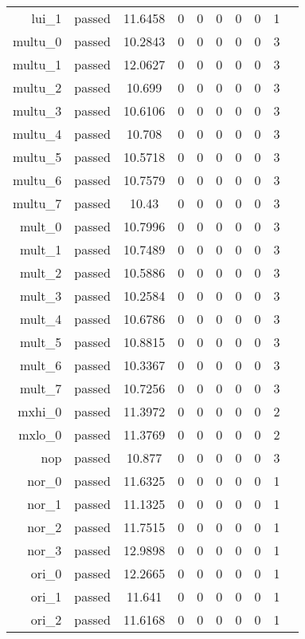 \begin{longtable}{r|ccccccccc}
    lui\_1 & passed & 11.6458 & 0 & 0 & 0 & 0 & 0 & 1 \\
    multu\_0 & passed & 10.2843 & 0 & 0 & 0 & 0 & 0 & 3 \\
    multu\_1 & passed & 12.0627 & 0 & 0 & 0 & 0 & 0 & 3 \\
    multu\_2 & passed & 10.699 & 0 & 0 & 0 & 0 & 0 & 3 \\
    multu\_3 & passed & 10.6106 & 0 & 0 & 0 & 0 & 0 & 3 \\
    multu\_4 & passed & 10.708 & 0 & 0 & 0 & 0 & 0 & 3 \\
    multu\_5 & passed & 10.5718 & 0 & 0 & 0 & 0 & 0 & 3 \\
    multu\_6 & passed & 10.7579 & 0 & 0 & 0 & 0 & 0 & 3 \\
    multu\_7 & passed & 10.43 & 0 & 0 & 0 & 0 & 0 & 3 \\
    mult\_0 & passed & 10.7996 & 0 & 0 & 0 & 0 & 0 & 3 \\
    mult\_1 & passed & 10.7489 & 0 & 0 & 0 & 0 & 0 & 3 \\
    mult\_2 & passed & 10.5886 & 0 & 0 & 0 & 0 & 0 & 3 \\
    mult\_3 & passed & 10.2584 & 0 & 0 & 0 & 0 & 0 & 3 \\
    mult\_4 & passed & 10.6786 & 0 & 0 & 0 & 0 & 0 & 3 \\
    mult\_5 & passed & 10.8815 & 0 & 0 & 0 & 0 & 0 & 3 \\
    mult\_6 & passed & 10.3367 & 0 & 0 & 0 & 0 & 0 & 3 \\
    mult\_7 & passed & 10.7256 & 0 & 0 & 0 & 0 & 0 & 3 \\
    mxhi\_0 & passed & 11.3972 & 0 & 0 & 0 & 0 & 0 & 2 \\
    mxlo\_0 & passed & 11.3769 & 0 & 0 & 0 & 0 & 0 & 2 \\
    nop & passed & 10.877 & 0 & 0 & 0 & 0 & 0 & 3 \\
    nor\_0 & passed & 11.6325 & 0 & 0 & 0 & 0 & 0 & 1 \\
    nor\_1 & passed & 11.1325 & 0 & 0 & 0 & 0 & 0 & 1 \\
    nor\_2 & passed & 11.7515 & 0 & 0 & 0 & 0 & 0 & 1 \\
    nor\_3 & passed & 12.9898 & 0 & 0 & 0 & 0 & 0 & 1 \\
    ori\_0 & passed & 12.2665 & 0 & 0 & 0 & 0 & 0 & 1 \\
    ori\_1 & passed & 11.641 & 0 & 0 & 0 & 0 & 0 & 1 \\
    ori\_2 & passed & 11.6168 & 0 & 0 & 0 & 0 & 0 & 1 \\

\end{longtable}
